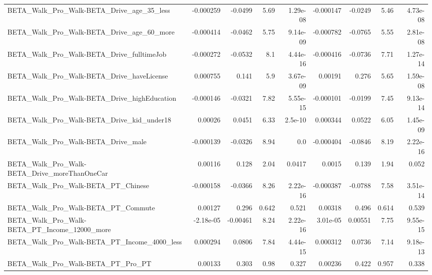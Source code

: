 \begin{tabular}{lrrrrrrrr}
BETA\_Walk\_Pro\_Walk-BETA\_Drive\_age\_35\_less          &   -0.000259 &      -0.0499 &      5.69 & 1.29e-08 &  -0.000147 &     -0.0249 &         5.46 &      4.73e-08 \\
BETA\_Walk\_Pro\_Walk-BETA\_Drive\_age\_60\_more          &   -0.000414 &      -0.0462 &      5.75 & 9.14e-09 &  -0.000782 &     -0.0765 &         5.55 &      2.81e-08 \\
BETA\_Walk\_Pro\_Walk-BETA\_Drive\_fulltimeJob          &   -0.000272 &      -0.0532 &       8.1 & 4.44e-16 &  -0.000416 &     -0.0736 &         7.71 &      1.27e-14 \\
BETA\_Walk\_Pro\_Walk-BETA\_Drive\_haveLicense          &    0.000755 &        0.141 &       5.9 & 3.67e-09 &    0.00191 &       0.276 &         5.65 &      1.59e-08 \\
BETA\_Walk\_Pro\_Walk-BETA\_Drive\_highEducation        &   -0.000146 &      -0.0321 &      7.82 & 5.55e-15 &  -0.000101 &     -0.0199 &         7.45 &      9.13e-14 \\
BETA\_Walk\_Pro\_Walk-BETA\_Drive\_kid\_under18          &     0.00026 &       0.0451 &      6.33 &  2.5e-10 &   0.000344 &      0.0522 &         6.05 &      1.45e-09 \\
BETA\_Walk\_Pro\_Walk-BETA\_Drive\_male                 &   -0.000139 &      -0.0326 &      8.94 &      0.0 &  -0.000404 &     -0.0846 &         8.19 &      2.22e-16 \\
BETA\_Walk\_Pro\_Walk-BETA\_Drive\_moreThanOneCar       &     0.00116 &        0.128 &      2.04 &   0.0417 &     0.0015 &       0.139 &         1.94 &         0.052 \\
BETA\_Walk\_Pro\_Walk-BETA\_PT\_Chinese                 &   -0.000158 &      -0.0366 &      8.26 & 2.22e-16 &  -0.000387 &     -0.0788 &         7.58 &      3.51e-14 \\
BETA\_Walk\_Pro\_Walk-BETA\_PT\_Commute                 &     0.00127 &        0.296 &     0.642 &    0.521 &    0.00318 &       0.496 &        0.614 &         0.539 \\
BETA\_Walk\_Pro\_Walk-BETA\_PT\_Income\_12000\_more       &   -2.18e-05 &     -0.00461 &      8.24 & 2.22e-16 &   3.01e-05 &     0.00551 &         7.75 &      9.55e-15 \\
BETA\_Walk\_Pro\_Walk-BETA\_PT\_Income\_4000\_less        &    0.000294 &       0.0806 &      7.84 & 4.44e-15 &   0.000312 &      0.0736 &         7.14 &      9.18e-13 \\
BETA\_Walk\_Pro\_Walk-BETA\_PT\_Pro\_PT                  &     0.00133 &        0.303 &      0.98 &    0.327 &    0.00236 &       0.422 &        0.957 &         0.338 \\

\end{tabular}

